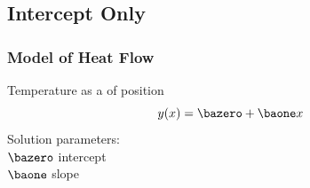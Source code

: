 % 

\subsection{Intercept Only}

\begin{frame}\frametitle{Model of Heat Flow}
\center
Temperature as a  of position
\begin{equation}
	y(x) = \bazero + \baone x
\label{eq:model}
\end{equation}
%
Solution parameters: \\
$\bazero$ intercept \\
$\baone$ slope
\end{frame}


